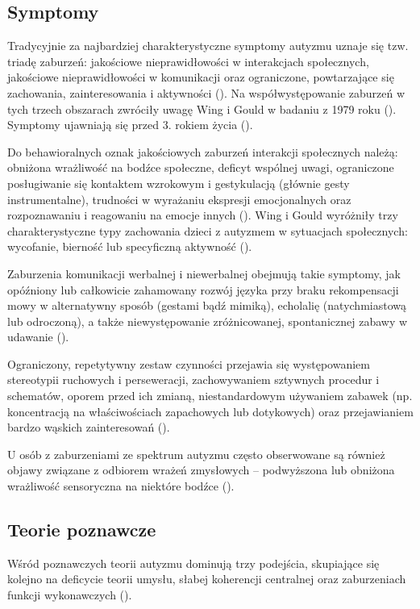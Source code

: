     \subsection{Symptomy}
    Tradycyjnie za najbardziej charakterystyczne symptomy autyzmu uznaje się tzw. triadę zaburzeń: jakościowe nieprawidłowości w interakcjach społecznych, jakościowe nieprawidłowości w komunikacji oraz ograniczone, powtarzające się zachowania, zainteresowania i aktywności (\cite{frith2008autyzm}).
    Na współwystępowanie zaburzeń w tych trzech obszarach zwróciły uwagę Wing i Gould w badaniu z 1979 roku (\cite{wing1979severe}).
    Symptomy ujawniają się przed 3. rokiem życia (\cite{komender2012autyzm}).
    
    Do behawioralnych oznak jakościowych zaburzeń interakcji społecznych należą: obniżona wrażliwość na bodźce społeczne, deficyt wspólnej uwagi, ograniczone posługiwanie się kontaktem wzrokowym i gestykulacją (głównie gesty instrumentalne), trudności w wyrażaniu ekspresji emocjonalnych oraz rozpoznawaniu i reagowaniu na emocje innych (\cite{komender2012autyzm}).
    Wing i Gould wyróżniły trzy charakterystyczne typy zachowania dzieci z autyzmem w sytuacjach społecznych: wycofanie, bierność lub specyficzną aktywność (\cite{wing1979severe}).
    
    Zaburzenia komunikacji werbalnej i niewerbalnej obejmują takie symptomy, jak opóźniony lub całkowicie zahamowany rozwój języka przy braku rekompensacji mowy w alternatywny sposób (gestami bądź mimiką), echolalię (natychmiastową lub odroczoną), a także niewystępowanie zróżnicowanej, spontanicznej zabawy w udawanie (\cite{komender2012autyzm}).
    
    Ograniczony, repetytywny zestaw czynności przejawia się występowaniem stereotypii ruchowych i perseweracji, zachowywaniem sztywnych procedur i schematów, oporem przed ich zmianą, niestandardowym używaniem zabawek (np. koncentracją na właściwościach zapachowych lub dotykowych) oraz przejawianiem bardzo wąskich zainteresowań (\cite{komender2012autyzm}).
    
    U osób z zaburzeniami ze spektrum autyzmu często obserwowane są również objawy związane z odbiorem wrażeń zmysłowych -- podwyższona lub obniżona wrażliwość sensoryczna na niektóre bodźce (\cite{pellicano2012world}).
    
    \subsection{Teorie poznawcze}
    Wśród poznawczych teorii autyzmu dominują trzy podejścia, skupiające się kolejno na deficycie teorii umysłu, słabej koherencji centralnej oraz zaburzeniach funkcji wykonawczych (\cite{rajendran2007cognitive}).
    
